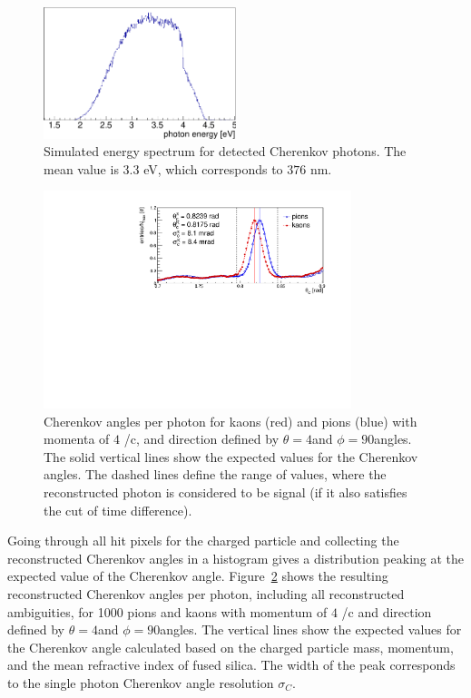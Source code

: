 \begin{figure}[!h]
\centering
\includegraphics[width=0.5\textwidth]{pics/lam.pdf}
\caption{\label{pic:lam}
Simulated energy spectrum for detected Cherenkov photons. The mean value is $3.3$ eV, which corresponds to $376$ nm.
}
\end{figure}

\begin{figure}[!h]
\centering
\includegraphics[clip, trim=0cm 0cm 0cm 0.7cm, width=0.8\textwidth]{pics/hangle_rich18.pdf}
\caption{\label{pic:spr}
Cherenkov angles per photon for kaons (red) and pions (blue) with momenta of $4$ {\gev}/c, and direction defined by $\theta = 4$\mydeg and $\phi = 90$\mydeg angles. The solid vertical lines show the expected values for the Cherenkov angles. The dashed lines define the range of values, where the reconstructed photon is considered to be signal (if it also satisfies the cut of time difference). 
}
\end{figure}

Going through all hit pixels for the charged particle and collecting the reconstructed Cherenkov angles in a histogram gives a distribution peaking at the expected value of the Cherenkov angle. Figure~\ref{pic:spr} shows the resulting reconstructed Cherenkov angles per photon, including all reconstructed ambiguities, for 1000 pions and kaons with momentum of $4$ {\gev}/c and direction defined by $\theta = 4$\mydeg and $\phi = 90$\mydeg angles. The vertical lines show the expected values for the Cherenkov angle calculated based on the charged particle mass, momentum, and the mean refractive index of fused silica. The width of the peak corresponds to the single photon Cherenkov angle resolution $\sigma_{C}$.

